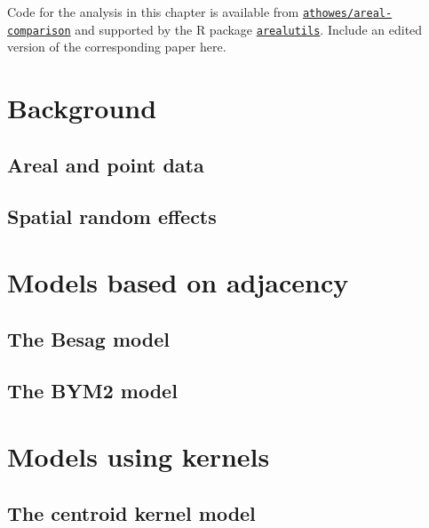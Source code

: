 \documentclass[a4paper, nobind]{templates/ociamthesis}
\begin{document}
\adjustmtc
{}

Code for the analysis in this chapter is available from \href{https://github.com/athowes/areal-comparison}{\texttt{athowes/areal-comparison}} and supported by the R package \href{https://athowes.github.io/arealutils}{\texttt{arealutils}}.
Include an edited version of the corresponding paper here.

\hypertarget{background-1}{%
\section{Background}\label{background-1}}

\hypertarget{areal-and-point-data}{%
\subsection{Areal and point data}\label{areal-and-point-data}}

\hypertarget{spatial-random-effects}{%
\subsection{Spatial random effects}\label{spatial-random-effects}}

\hypertarget{models-based-on-adjacency}{%
\section{Models based on adjacency}\label{models-based-on-adjacency}}

\hypertarget{the-besag-model}{%
\subsection{The Besag model}\label{the-besag-model}}

\hypertarget{the-bym2-model}{%
\subsection{The BYM2 model}\label{the-bym2-model}}

\hypertarget{models-using-kernels}{%
\section{Models using kernels}\label{models-using-kernels}}

\hypertarget{the-centroid-kernel-model}{%
\subsection{The centroid kernel model}\label{the-centroid-kernel-model}}
\end{document}
